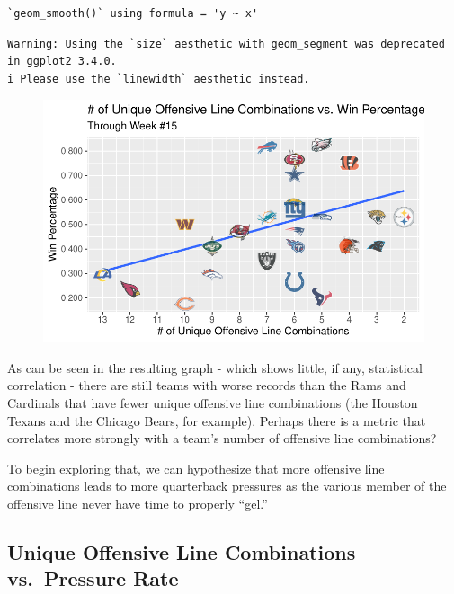 \documentclass[
  letterpaper,
]{krantz}
\begin{document}
\begin{verbatim}
`geom_smooth()` using formula = 'y ~ x'
\end{verbatim}

\begin{verbatim}
Warning: Using the `size` aesthetic with geom_segment was deprecated in ggplot2 3.4.0.
i Please use the `linewidth` aesthetic instead.
\end{verbatim}

\begin{figure}[H]

{\centering \includegraphics{01-nfl-analytics-and-r_files/figure-pdf/plot-combos-1.pdf}

}

\end{figure}

As can be seen in the resulting graph - which shows little, if any,
statistical correlation - there are still teams with worse records than
the Rams and Cardinals that have fewer unique offensive line
combinations (the Houston Texans and the Chicago Bears, for example).
Perhaps there is a metric that correlates more strongly with a team's
number of offensive line combinations?

To begin exploring that, we can hypothesize that more offensive line
combinations leads to more quarterback pressures as the various member
of the offensive line never have time to properly ``gel.''

\hypertarget{unique-offensive-line-combinations-vs.-pressure-rate}{%
\subsection{Unique Offensive Line Combinations vs.~Pressure
Rate}\label{unique-offensive-line-combinations-vs.-pressure-rate}}
\end{document}
